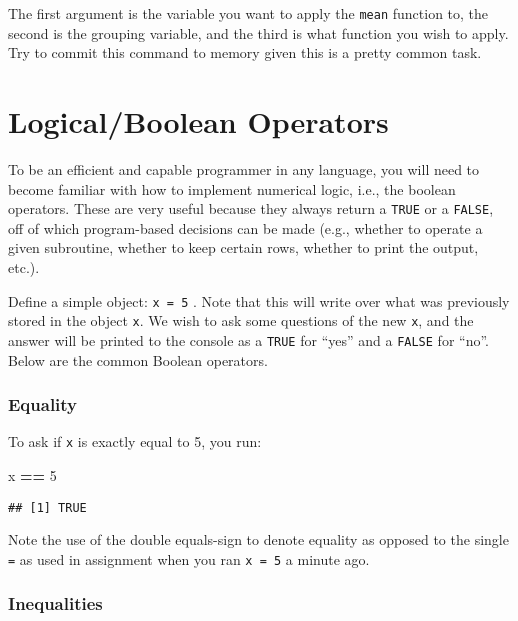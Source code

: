 \documentclass[]{book}
\newenvironment{Shaded}{\begin{snugshade}}{\end{snugshade}}
\newcommand{\DecValTok}[1]{\textcolor[rgb]{0.00,0.00,0.81}{#1}}
\newcommand{\StringTok}[1]{\textcolor[rgb]{0.31,0.60,0.02}{#1}}
\newcommand{\OperatorTok}[1]{\textcolor[rgb]{0.81,0.36,0.00}{\textbf{#1}}}
\newcommand{\NormalTok}[1]{#1}
\theoremstyle{definition}
\theoremstyle{definition}
\theoremstyle{definition}
\theoremstyle{remark}
\begin{document}
The first argument is the variable you want to apply the \texttt{mean}
function to, the second is the grouping variable, and the third is what
function you wish to apply. Try to commit this command to memory given
this is a pretty common task.

\section{Logical/Boolean Operators}\label{logicalboolean-operators}

To be an efficient and capable programmer in any language, you will need
to become familiar with how to implement numerical logic, i.e., the
boolean operators. These are very useful because they always return a
\texttt{TRUE} or a \texttt{FALSE}, off of which program-based decisions
can be made (e.g., whether to operate a given subroutine, whether to
keep certain rows, whether to print the output, etc.).

Define a simple object: \texttt{x\ =\ 5} . Note that this will write
over what was previously stored in the object \texttt{x}. We wish to ask
some questions of the new \texttt{x}, and the answer will be printed to
the console as a \texttt{TRUE} for ``yes'' and a \texttt{FALSE} for
``no''. Below are the common Boolean operators.

\subsubsection*{Equality}\label{equality}

To ask if \texttt{x} is exactly equal to 5, you run:

\begin{Shaded}
\begin{Highlighting}[]
\NormalTok{x }\OperatorTok{==}\StringTok{ }\DecValTok{5}
\end{Highlighting}
\end{Shaded}

\begin{verbatim}
## [1] TRUE
\end{verbatim}

Note the use of the double equals-sign to denote equality as opposed to
the single \texttt{=} as used in assignment when you ran
\texttt{x\ =\ 5} a minute ago.

\subsubsection*{Inequalities}\label{inequalities}
\end{document}
